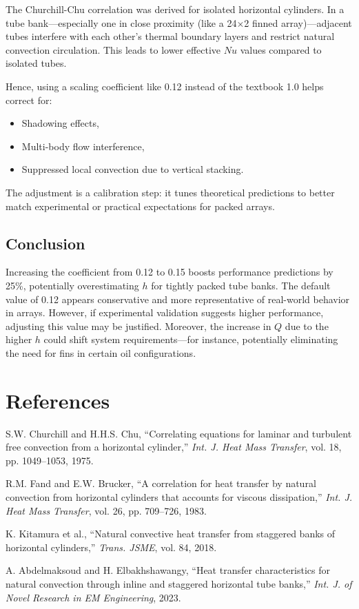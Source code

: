 \documentclass[12pt]{article}
\begin{document}
The Churchill-Chu correlation was derived for isolated horizontal cylinders. In a tube bank—especially one in close proximity (like a 24×2 finned array)—adjacent tubes interfere with each other’s thermal boundary layers and restrict natural convection circulation. This leads to lower effective $Nu$ values compared to isolated tubes.

Hence, using a scaling coefficient like 0.12 instead of the textbook 1.0 helps correct for:

\begin{itemize}
    \item Shadowing effects,
    \item Multi-body flow interference,
    \item Suppressed local convection due to vertical stacking.
\end{itemize}

The adjustment is a calibration step: it tunes theoretical predictions to better match experimental or practical expectations for packed arrays.

\subsection*{Conclusion}

Increasing the coefficient from 0.12 to 0.15 boosts performance predictions by 25\%, potentially overestimating $h$ for tightly packed tube banks. The default value of 0.12 appears conservative and more representative of real-world behavior in arrays. However, if experimental validation suggests higher performance, adjusting this value may be justified. Moreover, the increase in $Q$ due to the higher $h$ could shift system requirements—for instance, potentially eliminating the need for fins in certain oil configurations.


\section{References}
\begin{thebibliography}{9}
S.W. Churchill and H.H.S. Chu,
``Correlating equations for laminar and turbulent free convection from a horizontal cylinder,''
\emph{Int. J. Heat Mass Transfer}, vol. 18, pp. 1049--1053, 1975.

R.M. Fand and E.W. Brucker,
``A correlation for heat transfer by natural convection from horizontal cylinders that accounts for viscous dissipation,''
\emph{Int. J. Heat Mass Transfer}, vol. 26, pp. 709--726, 1983.

K. Kitamura et al.,
``Natural convective heat transfer from staggered banks of horizontal cylinders,''
\emph{Trans. JSME}, vol. 84, 2018.

A. Abdelmaksoud and H. Elbakhshawangy,
``Heat transfer characteristics for natural convection through inline and staggered horizontal tube banks,''
\emph{Int. J. of Novel Research in EM Engineering}, 2023.
\end{thebibliography}
\end{document}
